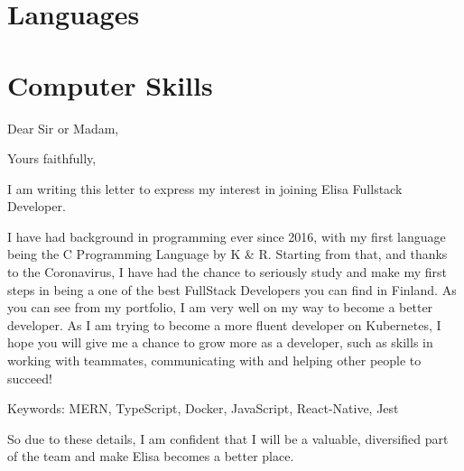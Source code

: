 \documentclass[11pt,a4paper,sans]{moderncv}
\begin{document}
  \section{Languages}

  \section{Computer Skills}

  \clearpage

  \date{February 8, 2021}
  \opening{Dear Sir or Madam,}
  \closing{Yours faithfully,}
  \makelettertitle

  I am writing this letter to express my interest in joining
  Elisa Fullstack Developer.

  I have had background in programming ever since 2016, with my
  first language being the C Programming Language by K \& R. Starting
  from that, and thanks to the Coronavirus, I have had the chance
  to seriously study and make my first steps in being a
  one of the best FullStack Developers you can find in Finland.
  As you can see from my portfolio, I am very well on my way to become
  a better developer. As I am trying to become a more fluent developer on Kubernetes,
  I hope you will give me a chance to grow more as a developer,
  such as skills in working with teammates, communicating with and helping other
  people to succeed!

  Keywords: MERN, TypeScript, Docker, JavaScript, React-Native, Jest

  So due to these details, I am confident that I will be a valuable, diversified
  part of the team and make Elisa becomes a better place.

  \makeletterclosing
\end{document}
